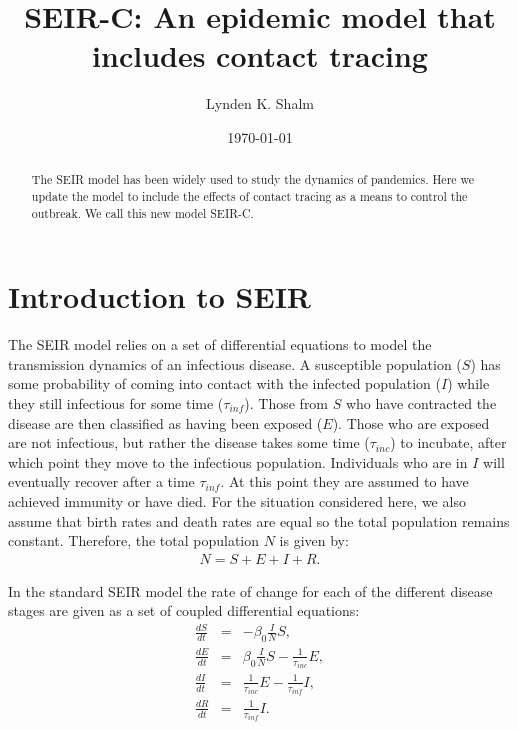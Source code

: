 \documentclass[notitlepage, superscriptaddress]{revtex4-2}
\begin{document}
\title{SEIR-C: An epidemic model that includes contact tracing}

\author{Lynden K. Shalm}



\begin{abstract}
The SEIR model has been widely used to study the dynamics of pandemics. Here we update the model to include the effects of contact tracing as a means to control the outbreak. We call this new model SEIR-C.
\end{abstract}
\date{\today}
\maketitle

\section{Introduction to SEIR}

The SEIR model relies on a set of differential equations to model the transmission dynamics of an infectious disease. A susceptible population ($S$) has some probability of coming into contact with the infected population ($I$) while they still infectious for some time ($\tau_{inf}$). Those from $S$ who have contracted the disease are then classified as having been exposed ($E$). Those who are exposed are not infectious, but rather the disease takes some time ($\tau_{inc}$) to incubate, after which point they move to the infectious population. Individuals who are in $I$ will eventually recover after a time $\tau_{inf}$. At this point they are assumed to have achieved immunity or have died. For the situation considered here, we also assume that birth rates and death rates are equal so the total population remains constant. Therefore, the total population $N$ is given by:
\begin{eqnarray}
\label{E:SEIRPop}
N = S + E + I + R.
\end{eqnarray}

In the standard SEIR model the rate of change for each of the different disease stages are given as a set of coupled differential equations:
\begin{eqnarray}
\label{E:SEIR}
\frac{dS}{dt} &=& - \beta_0 \frac{I}{N}S, \\
\frac{dE}{dt} &=& \beta_0 \frac{I}{N}S - \frac{1}{\tau_{inc}}E, \\ 
\frac{dI}{dt} &=& \frac{1}{\tau_{inc}}E - \frac{1}{\tau_{inf}}I, \\ 
\frac{dR}{dt} &=& \frac{1}{\tau_{inf}}I.
\end{eqnarray}
\end{document}
